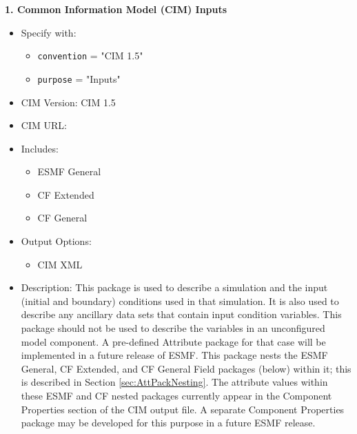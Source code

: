 \vspace{.20in}

{\bf 1. Common Information Model (CIM) Inputs}

\begin{itemize}
    \item Specify with:
    \begin{itemize}
        \item {\tt convention} = "CIM 1.5"
        \item {\tt purpose} = "Inputs"
    \end{itemize}
    \item CIM Version: CIM 1.5
    \item CIM URL: 
    \item Includes: 
    \begin{itemize}
        \item ESMF General
        \item CF Extended
        \item CF General
    \end{itemize}
    \item Output Options:
    \begin{itemize}
        \item CIM XML 
    \end{itemize}
    \item Description: This package is used to describe a simulation and the input (initial and boundary) conditions used in that simulation. It is also used to describe any ancillary data sets that contain input condition variables. This package should not be used to describe the variables in an unconfigured model component. A pre-defined Attribute package for that case will be implemented in a future release of ESMF.  This package nests the ESMF General, CF Extended, and CF General Field packages (below) within it; this is described in Section \ref{sec:AttPackNesting}.  The attribute values within these ESMF and CF nested packages currently appear in the Component Properties section of the CIM output file.  A separate Component Properties package may be developed for this purpose in a future ESMF release.
\end{itemize}

